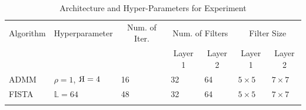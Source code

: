 \begin{table}[] 
\caption{Architecture and Hyper-Parameters for Experiment}
\begin{center}
\begin{tabular}{@{}lllllll@{}}
\toprule
\multicolumn{1}{c}{Algorithm} & \multicolumn{1}{c}{Hyperparameter} & \multicolumn{1}{c}{Num. of Iter.} & \multicolumn{2}{c}{Num. of Filters}                     & \multicolumn{2}{c}{Filter Size}                           \\ %
      &      &            & \multicolumn{1}{c}{Layer 1} & \multicolumn{1}{c}{Layer 2} & \multicolumn{1}{c}{Layer 1} & \multicolumn{1}{c}{Layer 2} \\ \midrule
ADMM                          & $\rho = 1$, $\reflectbox{R} = 4$                     & 16                        & 32                          & 64                          & $5 \times 5$                & $7 \times 7$                \\
FISTA                         & $\mathbb{L} = 64$                      & 48                            & 32                          & 64                          & $5 \times 5$                & $7 \times 7$                \\ \bottomrule
\label{table:JPEG Artifact Removal Architecture}
\end{tabular}
\end{center}
\end{table}
